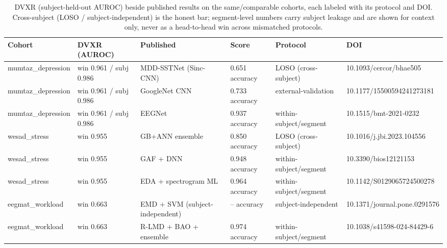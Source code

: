 \begin{table}[t]
\centering
\caption{DVXR (subject-held-out AUROC) beside published results on the same/comparable cohorts, each labeled with its protocol and DOI. Cross-subject (LOSO / subject-independent) is the honest bar; segment-level numbers carry subject leakage and are shown for context only, never as a head-to-head win across mismatched protocols.}
\label{tab:sota}
\begin{tabular}{llllll}
\toprule
Cohort & DVXR (AUROC) & Published & Score & Protocol & DOI \\
\midrule
mumtaz\_depression & win 0.961 / subj 0.986 & MDD-SSTNet (Sinc-CNN) & 0.651 accuracy & LOSO (cross-subject) & 10.1093/cercor/bhae505 \\
mumtaz\_depression & win 0.961 / subj 0.986 & GoogleNet CNN & 0.733 accuracy & external-validation & 10.1177/15500594241273181 \\
mumtaz\_depression & win 0.961 / subj 0.986 & EEGNet & 0.937 accuracy & within-subject/segment & 10.1515/bmt-2021-0232 \\
wesad\_stress & win 0.955 & GB+ANN ensemble & 0.850 accuracy & LOSO (cross-subject) & 10.1016/j.jbi.2023.104556 \\
wesad\_stress & win 0.955 & GAF + DNN & 0.948 accuracy & within-subject/segment & 10.3390/bios12121153 \\
wesad\_stress & win 0.955 & EDA + spectrogram ML & 0.964 accuracy & within-subject/segment & 10.1142/S0129065724500278 \\
eegmat\_workload & win 0.663 & EMD + SVM (subject-independent) & -- accuracy & subject-independent & 10.1371/journal.pone.0291576 \\
eegmat\_workload & win 0.663 & R-LMD + BAO + ensemble & 0.974 accuracy & within-subject/segment & 10.1038/s41598-024-84429-6 \\
\bottomrule
\end{tabular}
\end{table}
